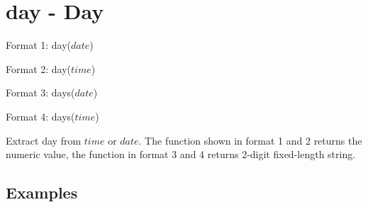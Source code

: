 
%

\section{day - Day\label{sect:day}}

Format 1: day($date$)

Format 2: day($time$)

Format 3: days($date$)

Format 4: days($time$)


Extract day from $time$ or $date$. The function shown in format 1 and 2 returns the numeric value, the function in format 3 and 4 returns 2-digit fixed-length string.


\subsection*{Examples}


%


